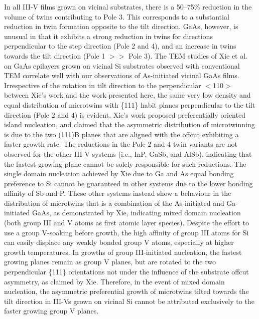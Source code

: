In all III-V films grown on vicinal substrates, there is a 50--75\% reduction in the volume of twins contributing to Pole 3.
This corresponds to a substantial reduction in twin formation opposite to the tilt direction.
GaAs, however, is unusual in that it exhibits a strong reduction in twins for directions perpendicular to the step direction (Pole 2 and 4), and an increase in twins towards the tilt direction (Pole 1 \(>>\) Pole 3).
The TEM studies of Xie et al.\cite{Xie1990} on GaAs epilayers grown on vicinal Si substrates observed with conventional TEM correlate well with our observations of As-initiated vicinal GaAs films.
Irrespective of the rotation in tilt direction to the perpendicular \(<\)110\(>\) between Xie's work and the work presented here, the same very low density and equal distribution of microtwins with \{111\} habit planes perpendicular to the tilt direction (Pole 2 and 4) is evident.
Xie's work proposed preferentially oriented island nucleation, and claimed that the asymmetric distribution of microtwinning is due to the two (111)B planes that are aligned with the offcut exhibiting a faster growth rate.
The reductions in the Pole 2 and 4 twin variants are not observed for the other III-V systems (i.e.,
InP, GaSb, and AlSb), indicating that the fastest-growing plane cannot be solely responsible for such reductions.
The single domain nucleation achieved by Xie due to Ga and As equal bonding preference to Si\cite{Bringans1988} cannot be guaranteed in other systems due to the lower bonding affinity of Sb\cite{Kubiak1985} and P\cite{Kiyota2001}.
These other systems instead show a behaviour in the distribution of microtwins that is a combination of the As-initiated and Ga-initiated GaAs, as demonstrated by Xie, indicating mixed domain nucleation (both group III and V atoms as first atomic layer species).
Despite the effort to use a group V-soaking before growth, the high affinity of group III atoms for Si can easily displace any weakly bonded group V atoms, especially at higher growth temperatures.
In growths of group III-initiated nucleation, the fastest growing planes remain as group V planes, but are rotated to the two perpendicular \{111\} orientations not under the influence of the substrate offcut asymmetry, as claimed by Xie.
Therefore, in the event of mixed domain nucleation, the asymmetric preferential growth of microtwins tilted towards the tilt direction in III-Vs grown on vicinal Si cannot be attributed exclusively to the faster growing group V planes.

